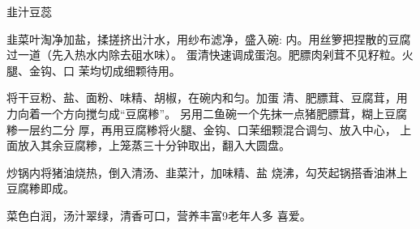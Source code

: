 \begin{recipe}{韭汁豆蕊}

\ingredients


\cooking

\step 韭菜叶淘净加盐，揉搓挤出汁水，用纱布滤净，盛入碗: 内。用丝箩把捏散的豆腐过一道（先入热水内除去砠水味）。 蛋清快速调成蛋泡。肥膘肉剁茸不见籽粒。火腿、金钩、口 茉均切成细颗待用。

\step 将干豆粉、盐、面粉、味精、胡椒，在碗内和匀。加蛋 清、肥膘茸、豆腐茸，用力向着一个方向搅匀成“豆腐糁”。 另用二鱼碗一个先抹一点猪肥膘茸，糊上豆腐糁一层约二分 厚，再用豆腐糁将火腿、金钩、口茉细颗混合调匀、放入中心， 上面放入其余豆腐糁，上笼蒸三十分钟取出，翻入大圆盘。

\step 炒锅内将猪油烧热，倒入清汤、韭菜汁，加味精、盐 烧沸，勾芡起锅搭香油淋上豆腐糁即成。

\notes

菜色白润，汤汁翠绿，清香可口，营养丰富9老年人多 喜爱。

\end{recipe}


